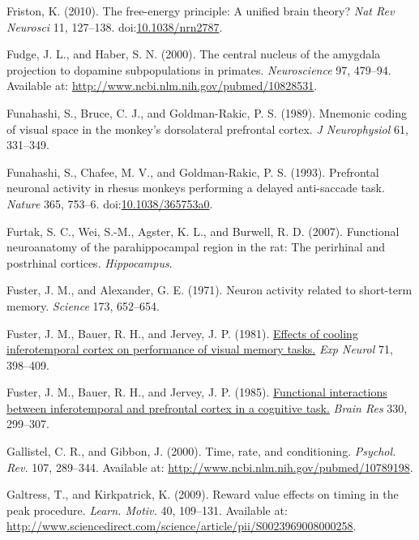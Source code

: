\documentclass[
  11pt,
  a4paper,
]{scrbook}
\newlength{\cslhangindent}
\newenvironment{CSLReferences}[2] %
 {\begin{list}{}{%
  \setlength{\itemindent}{0pt}
  \setlength{\leftmargin}{0pt}
  \setlength{\parsep}{0pt}
  \ifodd #1
   \setlength{\leftmargin}{\cslhangindent}
   \setlength{\itemindent}{-1\cslhangindent}
  \fi
  \setlength{\itemsep}{#2\baselineskip}}}
 {\end{list}}
\begin{document}
\begin{CSLReferences}{1}{1}
Friston, K. (2010). The free-energy principle: A unified brain theory?
\emph{Nat Rev Neurosci} 11, 127--138.
doi:\href{https://doi.org/10.1038/nrn2787}{10.1038/nrn2787}.

Fudge, J. L., and Haber, S. N. (2000). {The central nucleus of the
amygdala projection to dopamine subpopulations in primates.}
\emph{Neuroscience} 97, 479--94. Available at:
\url{http://www.ncbi.nlm.nih.gov/pubmed/10828531}.

Funahashi, S., Bruce, C. J., and Goldman-Rakic, P. S. (1989). Mnemonic
coding of visual space in the monkey's dorsolateral prefrontal cortex.
\emph{J Neurophysiol} 61, 331--349.

Funahashi, S., Chafee, M. V., and Goldman-Rakic, P. S. (1993).
{Prefrontal neuronal activity in rhesus monkeys performing a delayed
anti-saccade task.} \emph{Nature} 365, 753--6.
doi:\href{https://doi.org/10.1038/365753a0}{10.1038/365753a0}.

Furtak, S. C., Wei, S.-M., Agster, K. L., and Burwell, R. D. (2007).
Functional neuroanatomy of the parahippocampal region in the rat: The
perirhinal and postrhinal cortices. \emph{Hippocampus}.

Fuster, J. M., and Alexander, G. E. (1971). Neuron activity related to
short-term memory. \emph{Science} 173, 652--654.

Fuster, J. M., Bauer, R. H., and Jervey, J. P. (1981).
\href{https://www.ncbi.nlm.nih.gov/pubmed/7449907}{Effects of cooling
inferotemporal cortex on performance of visual memory tasks.} \emph{Exp
Neurol} 71, 398--409.

Fuster, J. M., Bauer, R. H., and Jervey, J. P. (1985).
\href{https://www.ncbi.nlm.nih.gov/pubmed/3986545}{Functional
interactions between inferotemporal and prefrontal cortex in a cognitive
task.} \emph{Brain Res} 330, 299--307.

Gallistel, C. R., and Gibbon, J. (2000). {Time, rate, and conditioning.}
\emph{Psychol. Rev.} 107, 289--344. Available at:
\url{http://www.ncbi.nlm.nih.gov/pubmed/10789198}.

Galtress, T., and Kirkpatrick, K. (2009). {Reward value effects on
timing in the peak procedure}. \emph{Learn. Motiv.} 40, 109--131.
Available at:
\url{http://www.sciencedirect.com/science/article/pii/S0023969008000258}.


\end{CSLReferences}
\end{document}
